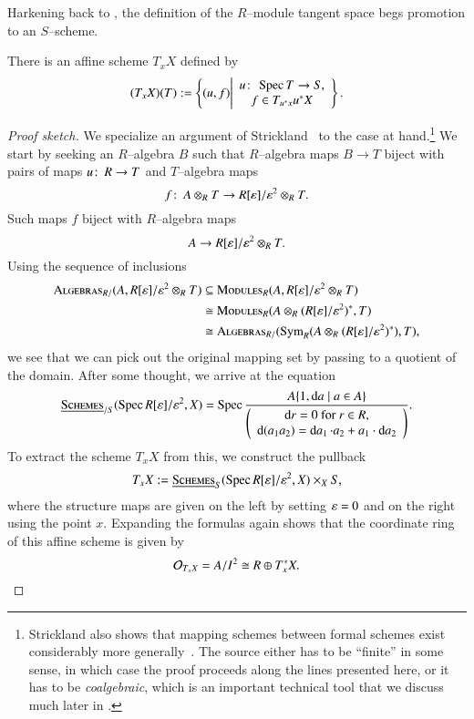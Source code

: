 Harkening back to , the definition of the $R$--module tangent space begs promotion to an $S$--scheme.
\begin{lemma}\label{ConstructionTangentAffineScheme}
There is an affine scheme $T_x X$ defined by \[(T_x X)(T) := \left\{ (u, f) \middle| \begin{array}{c} u\colon\thinspace \operatorname{Spec} T \to S, \\ f \in T_{u^* x} u^* X \end{array} \right\}.\]
\end{lemma}
\begin{proof}[Proof sketch]
We specialize an argument of Strickland~\cite[Proposition 2.94]{StricklandFSFG} to the case at hand.\footnote{Strickland also shows that mapping schemes between formal schemes exist considerably more generally~\cite[Theorem 4.69]{StricklandFSFG}.  The source either has to be ``finite'' in some sense, in which case the proof proceeds along the lines presented here, or it has to be \textit{coalgebraic}, which is an important technical tool that we discuss much later in .}  We start by seeking an $R$--algebra $B$ such that $R$--algebra maps $B \to T$ biject with pairs of maps $u\colon\thinspace R \to T$ and $T$--algebra maps \[f\colon\thinspace A \otimes_R T \to R[\varepsilon] / \varepsilon^2 \otimes_R T.\]  Such maps $f$ biject with $R$--algebra maps \[A \to R[\varepsilon] / \varepsilon^2 \otimes_R T.\]  Using the sequence of inclusions
\begin{align*}
\normalfont\textsc{Algebras}_{R/}(A, R[\varepsilon] / \varepsilon^2 \otimes_R T) & \subseteq \normalfont\textsc{Modules}_R(A, R[\varepsilon] / \varepsilon^2 \otimes_R T) \\
& \cong \normalfont\textsc{Modules}_R(A \otimes_R (R[\varepsilon] / \varepsilon^2)^*, T) \\
& \cong \normalfont\textsc{Algebras}_{R/}(\operatorname{Sym}_R(A \otimes_R (R[\varepsilon] / \varepsilon^2)^*), T),
\end{align*}
we see that we can pick out the original mapping set by passing to a quotient of the domain.  After some thought, we arrive at the equation \[\operatorname{\underline{\smash{\normalfont\textsc{Schemes}}}}_{/S}(\operatorname{Spec} R[\varepsilon] / \varepsilon^2, X) = \operatorname{Spec} \frac{A\{1, \operatorname{d\mathit{a}} \mid a \in A\}}{\left( \begin{array}{c} \text{$\operatorname{d\mathit{r}} = 0$ for $r \in R$}, \\ \operatorname{d}(a_1 a_2) = \operatorname{d\mathit{a}_1} \cdot a_2 + a_1 \cdot \operatorname{d\mathit{a}_2} \end{array} \right)} .\]  To extract the scheme $T_x X$ from this, we construct the pullback \[T_x X := \operatorname{\underline{\smash{\normalfont\textsc{Schemes}}}}_S(\operatorname{Spec} R[\varepsilon] / \varepsilon^2, X) \times_X S,\] where the structure maps are given on the left by setting $\varepsilon = 0$ and on the right using the point $x$.  Expanding the formulas again shows that the coordinate ring of this affine scheme is given by \[\mathcal{O}_{T_x X} = A / I^2 \cong R \oplus T^*_x X. \qedhere\]
\end{proof}

